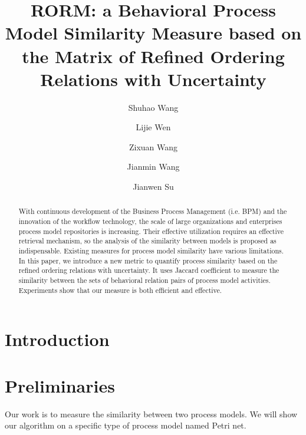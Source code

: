 \documentclass{llncs}
\begin{document}
\frontmatter 
{}

\mainmatter
\title{RORM: a Behavioral Process Model Similarity Measure based on the Matrix of Refined Ordering Relations with Uncertainty}

\author[$\$$]{Shuhao Wang}
\author[$\$$]{Lijie Wen}
\author[$\$$]{Zixuan Wang}
\author[$\$$]{Jianmin Wang}
\author[$\#$]{Jianwen Su}
\institute{}

\maketitle

\begin{abstract}
With continuous development of the Business Process Management (i.e. BPM) and the innovation of the workflow technology, the scale of large organizations and enterprises process model repositories is increasing. Their effective utilization requires an effective retrieval mechanism, so the analysis of the similarity between models is proposed as indispensable. Existing measures for process model similarity have various limitations. In this paper, we introduce a new metric to quantify process similarity based on the refined ordering relations with uncertainty. It uses Jaccard coefficient to measure the similarity between the sets of behavioral relation pairs of process model activities. Experiments show that our measure is both efficient and effective.
\end{abstract}

\section{Introduction}\label{sec:introduction}

\section{Preliminaries}\label{sec:preliminaries}
Our work is to measure the similarity between two process models. We will show our algorithm on a specific type of process model named Petri net.
\end{document}
